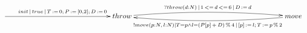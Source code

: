 $\xymatrix{
   \ar[rrrrr]^{init\,|\,true\,|\,T\,:=\,0;\,P\,:=\,[0,2];\,D\,:=\,0} &&&&& {throw} \ar@/^/[rrrrrrr]^{?throw(d:N)\,|\,1\,<=\,d\,<=\,6\,|\,D\,:=\,d} &&&&&&& {move} \ar@/^/[lllllll]^{!move(p:N,\,l:N) | T=p \land l = (P[p]\,+\,D)\,\%\,4\,|\,[p]\,:=\,l;\,T\,:=\,p\,\%\,2}}$
